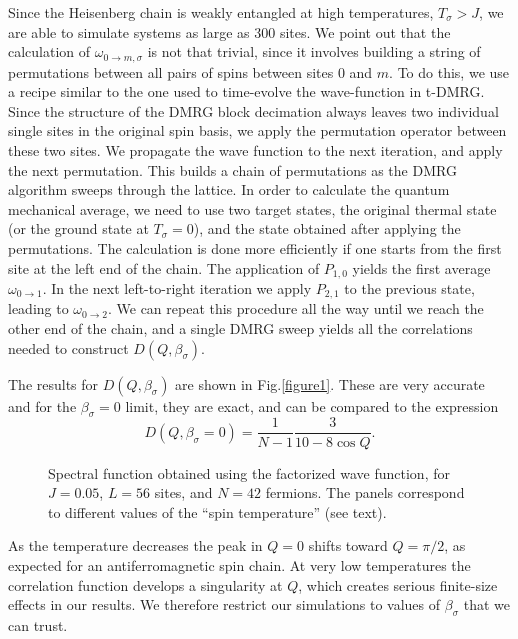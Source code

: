 \documentclass[article,11pt]{revtex4}
\begin{document}
Since the Heisenberg chain is weakly entangled at high temperatures, $T_\sigma > J$, we are able to simulate systems as large as 300 sites. We point out that the calculation of $\omega_{0 \rightarrow m,\sigma}$ is not that trivial, since it involves building a string of permutations between all pairs of spins between sites $0$ and $m$. To do this, we use a recipe similar to the one used to time-evolve the wave-function in t-DMRG. Since the structure of the DMRG block decimation always leaves two individual single sites in the original spin basis, we apply the permutation operator between these two sites. We propagate the wave function to the next iteration, and apply the next permutation. This builds a chain of permutations as the DMRG algorithm sweeps through the lattice. In order to calculate the quantum mechanical average, we need to use two target states, the original thermal state (or the ground state at $T_\sigma=0$), and the state obtained after applying the permutations. The calculation is done more efficiently if one starts from the first site at the left end of the chain. The application of $P_{1,0}$ yields the first average $\omega_{0\rightarrow 1}$. In the next left-to-right iteration we apply $P_{2,1}$ to the previous state, leading to $\omega_{0\rightarrow 2}$. We can repeat this procedure all the way until we reach the other end of the chain, and a single DMRG sweep yields all the correlations needed to construct $D(Q,\beta_\sigma)$. 




The results for $D(Q,\beta_\sigma)$ are shown in Fig.\ref{figure1}. These are very accurate and for the $\beta_\sigma=0$ limit, they are exact, and can be compared to the expression 
\begin{equation}
\label{D_Q_beta0}
D(Q,\beta_\sigma=0)=\frac{1}{N-1}\frac{3}{10-8\cos{Q}}.
\end{equation}

\begin{figure}
\epsfxsize=8cm \centerline{}
\caption{ 
Spectral function obtained using the factorized wave function, for $J=0.05$, $L=56$ sites, and $N=42$ fermions. The panels correspond to different values of the ``spin temperature'' (see text).  
}
\label{figure2}
\vspace{0.25cm}
\end{figure}

As the temperature decreases the peak in $Q=0$ shifts toward $Q=\pi/2$, as expected for an antiferromagnetic spin chain. At very low temperatures the correlation function develops a singularity at $Q$, which creates serious finite-size effects in our results. We therefore restrict our simulations to values of $\beta_\sigma$ that we can trust.
\end{document}
